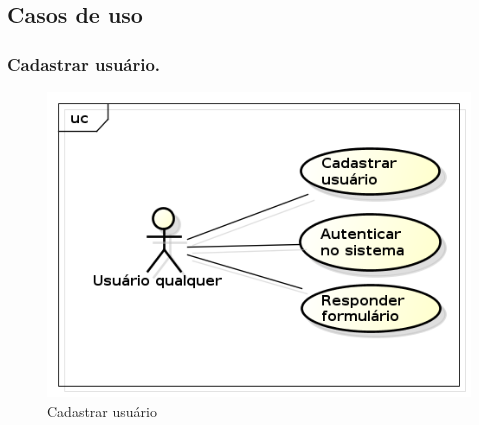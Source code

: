 \documentclass[11pt]{article}
\begin{document}
    \clearpage

    \subsection{Casos de uso}
      
      \subsubsection{Cadastrar usuário.}

        \begin{figure}[h!]
          \centering
          \includegraphics[width=.5\textwidth]{auth_create_user.png}
          \caption{Cadastrar usuário}
        \end{figure}
\end{document}
